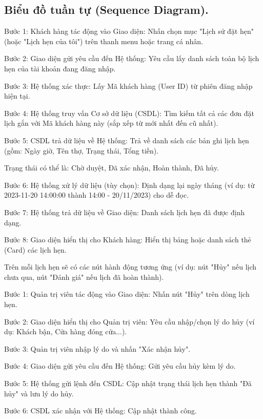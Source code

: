 \documentclass[../BTL.tex]{subfiles}
\begin{document}
\subsection{Biểu đồ tuần tự (Sequence Diagram).}

Bước 1: Khách hàng tác động vào Giao diện: Nhấn chọn mục "Lịch sử đặt
hẹn" (hoặc "Lịch hẹn của tôi") trên thanh menu hoặc trang cá nhân.

Bước 2: Giao diện gửi yêu cầu đến Hệ thống: Yêu cầu lấy danh sách toàn
bộ lịch hẹn của tài khoản đang đăng nhập.

Bước 3: Hệ thống xác thực: Lấy Mã khách hàng (User ID) từ phiên đăng
nhập hiện tại.

Bước 4: Hệ thống truy vấn Cơ sở dữ liệu (CSDL): Tìm kiếm tất cả các đơn
đặt lịch gắn với Mã khách hàng này (sắp xếp từ mới nhất đến cũ nhất).

Bước 5: CSDL trả dữ liệu về Hệ thống: Trả về danh sách các bản ghi lịch
hẹn (gồm: Ngày giờ, Tên thợ, Trạng thái, Tổng tiền).

Trạng thái có thể là: Chờ duyệt, Đã xác nhận, Hoàn thành, Đã hủy.

Bước 6: Hệ thống xử lý dữ liệu (tùy chọn): Định dạng lại ngày tháng (ví
dụ: từ 2023-11-20 14:00:00 thành 14:00 - 20/11/2023) cho dễ đọc.

Bước 7: Hệ thống trả dữ liệu về Giao diện: Danh sách lịch hẹn đã được
định dạng.

Bước 8: Giao diện hiển thị cho Khách hàng: Hiển thị bảng hoặc danh sách
thẻ (Card) các lịch hẹn.

Trên mỗi lịch hẹn sẽ có các nút hành động tương ứng (ví dụ: nút "Hủy"
nếu lịch chưa qua, nút "Đánh giá" nếu lịch đã hoàn thành).


Bước 1: Quản trị viên tác động vào Giao diện: Nhấn nút "Hủy" trên dòng
lịch hẹn.

Bước 2: Giao diện hiển thị cho Quản trị viên: Yêu cầu nhập/chọn lý do
hủy (ví dụ: Khách bận, Cửa hàng đóng cửa...).

Bước 3: Quản trị viên nhập lý do và nhấn "Xác nhận hủy".

Bước 4: Giao diện gửi yêu cầu đến Hệ thống: Gửi yêu cầu hủy kèm lý do.

Bước 5: Hệ thống gửi lệnh đến CSDL: Cập nhật trạng thái lịch hẹn thành
"Đã hủy" và lưu lý do hủy.

Bước 6: CSDL xác nhận với Hệ thống: Cập nhật thành công.
\end{document}

